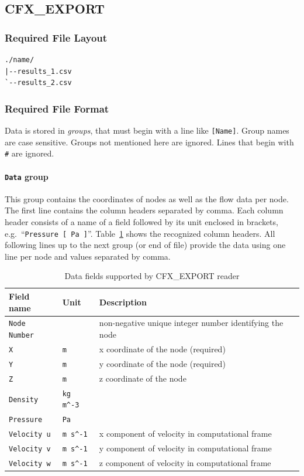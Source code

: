 \documentclass[a4paper,10pt]{article}
\begin{document}
\clearpage
\subsection{CFX\_EXPORT}
\label{sec:cfx-export}
\subsubsection{Required File Layout}
\begin{verbatim}
./name/
|--results_1.csv
`--results_2.csv
\end{verbatim}

\subsubsection{Required File Format}
Data  is  stored   in  \emph{groups},  that  must  begin   with  a  line  like
\texttt{[Name]}. Group names are case sensitive. Groups not mentioned here are
ignored. Lines that begin with \texttt{\#} are ignored.

\paragraph{\texttt{Data} group}
This group  contains the  coordinates of nodes  as well  as the flow  data per
node.  The  first line  contains the column  headers separated by  comma. Each
column header consists of  a name of a field followed by  its unit enclosed in
brackets, e.g.\ ``\texttt{Pressure [ Pa ]}''. Table~\ref{tab:csv_fields} shows
the recognized  column headers. All following  lines up to the  next group (or
end of file) provide the data using  one line per node and values separated by
comma.

\begin{table}[htb]
\centering
\caption{Data fields supported by CFX\_EXPORT reader}
\label{tab:csv_fields}
\begin{tabular}{lll}
	\textbf{Field name} & \textbf{Unit} & \textbf{Description} \\
	\hline\hline
	\texttt{Node Number} & & non-negative unique integer number identifying the
	node \\
	\hline
	\texttt{X} & \texttt{m} & x coordinate of the node (required) \\
	\hline
	\texttt{Y} & \texttt{m} & y coordinate of the node (required) \\
	\hline
	\texttt{Z} & \texttt{m} & z coordinate of the node \\
	\hline
	\texttt{Density} & \verb|kg m^-3| \\
	\hline
	\texttt{Pressure} & \texttt{Pa} \\
	\hline
	\texttt{Velocity u} & \verb|m s^-1| & x component of velocity in computational
	frame \\
	\hline
	\texttt{Velocity v} & \verb|m s^-1| & y component of velocity in computational
	frame
	\\
	\hline
	\texttt{Velocity w} & \verb|m s^-1| & z component of velocity in computational
	frame \\
	\hline\hline
\end{tabular}
\end{table}
\end{document}
